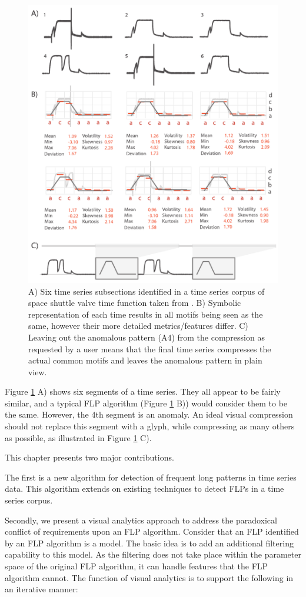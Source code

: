 \begin{figure}[t!]
\centering
\includegraphics[width=.6\textwidth]{images/timeseries/ecg_bad_refine}
\caption{A) Six time series subsections identified in a time series corpus of space shuttle valve time function taken from \cite{keogh_datasets}.
B) Symbolic representation of each time results in all motifs being seen as the same, however their more detailed metrics/features differ.
C) Leaving out the anomalous pattern (A4) from the compression as requested by a user means that the final time series compresses the actual common motifs and leaves the anomalous pattern in plain view.}
\label{fig:bad_example}
\vspace{-10pt}
\end{figure}

Figure \ref{fig:bad_example} A) shows six segments of a time series.
They all appear to be fairly similar, and a typical FLP algorithm (Figure \ref{fig:bad_example} B)) would consider them to be the same.
However, the 4th segment is an anomaly.
An ideal visual compression should not replace this segment with a glyph, while compressing as many others as possible, as illustrated in Figure \ref{fig:bad_example} C).

This chapter presents two major contributions.

The first is a new algorithm for detection of frequent long patterns in time series data.
This algorithm extends on existing techniques to detect FLPs in a time series corpus.
 
Secondly, we present a visual analytics approach to address the paradoxical conflict of requirements upon an FLP algorithm.
Consider that an FLP identified by an FLP algorithm is a model. The basic idea is to add an additional filtering capability to this model. As the filtering does not take place within the parameter space of the original FLP algorithm, it can handle features that the FLP algorithm cannot. The function of visual analytics is to support the following in an iterative manner:

